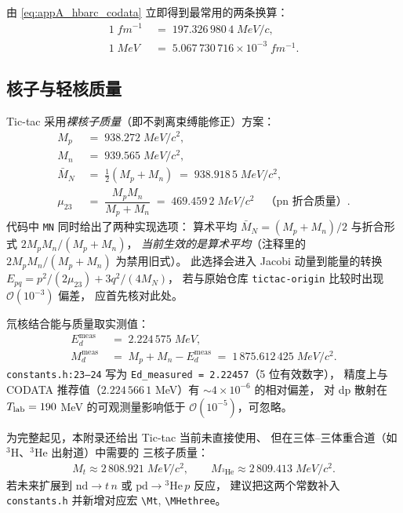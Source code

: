 由 \cref{eq:appA_hbarc_codata} 立即得到最常用的两条换算：
\begin{align}
1\;\si{fm}^{-1} &\;=\; 197.326\,980\,4\;\si{MeV/c},
\label{eq:appA_inv_fm_to_mev}\\
1\;\si{MeV} &\;=\; 5.067\,730\,716\times 10^{-3}\;\si{fm^{-1}}.
\label{eq:appA_mev_to_inv_fm}
\end{align}

\subsection{核子与轻核质量}

Tic-tac 采用\emph{裸核子质量}（即不剥离束缚能修正）方案：
\begin{align}
M_p &\;=\; 938.272\;\si{MeV/c^2},
\label{eq:appA_Mp}\\
M_n &\;=\; 939.565\;\si{MeV/c^2},
\label{eq:appA_Mn}\\
\bar{M}_N &\;=\; \tfrac{1}{2}(M_p + M_n) \;=\; 938.918\,5\;\si{MeV/c^2},
\label{eq:appA_MN_avg}\\
\mu_{23} &\;=\; \dfrac{M_p M_n}{M_p + M_n} \;=\; 469.459\,2\;\si{MeV/c^2}
                  \quad\text{（pn 折合质量）}.
\label{eq:appA_mu23}
\end{align}
代码中 \texttt{MN} 同时给出了两种实现选项：
算术平均 $\bar{M}_N = (M_p+M_n)/2$ 与折合形式 $2 M_p M_n/(M_p+M_n)$，
\emph{当前生效的是算术平均}（注释里的 $2 M_p M_n/(M_p+M_n)$ 为禁用旧式）。
此选择会进入 Jacobi 动量到能量的转换 $E_{pq} = p^2/(2\mu_{23}) + 3 q^2/(4 M_N)$，
若与原始仓库 \texttt{tictac-origin} 比较时出现 $\mathcal{O}(10^{-3})$ 偏差，
应首先核对此处。

氘核结合能与质量取实测值：
\begin{align}
E_d^{\text{meas}} &\;=\; 2.224\,575\;\si{MeV},
\label{eq:appA_Ed_measured}\\
M_d^{\text{meas}} &\;=\; M_p + M_n - E_d^{\text{meas}}
                   \;=\; 1\,875.612\,425\;\si{MeV/c^2}.
\label{eq:appA_Md_measured}
\end{align}
\texttt{constants.h:23–24} 写为 \texttt{Ed\_measured = 2.22457}（5 位有效数字），
精度上与 CODATA 推荐值（$2.224\,566\,1$ \si{MeV}）有 $\sim 4\times 10^{-6}$ 的相对偏差，
对 dp 散射在 ${T_{\text{lab}}} = 190$ \si{MeV} 的可观测量影响低于
$\mathcal{O}(10^{-5})$，可忽略。

为完整起见，本附录还给出 Tic-tac 当前未直接使用、
但在三体–三体重合道（如 $^3\mathrm{H}$、$^3\mathrm{He}$ 出射道）中需要的
三核子质量：
\begin{align}
M_t \approx 2\,808.921\;\si{MeV/c^2}, \qquad
M_{^3\mathrm{He}} \approx 2\,809.413\;\si{MeV/c^2}.
\end{align}
若未来扩展到 $\mathrm{nd}\to t\,n$ 或 $\mathrm{pd}\to {}^3\mathrm{He}\,p$ 反应，
建议把这两个常数补入 \texttt{constants.h} 并新增对应宏 \verb|\Mt|, \verb|\MHethree|。

